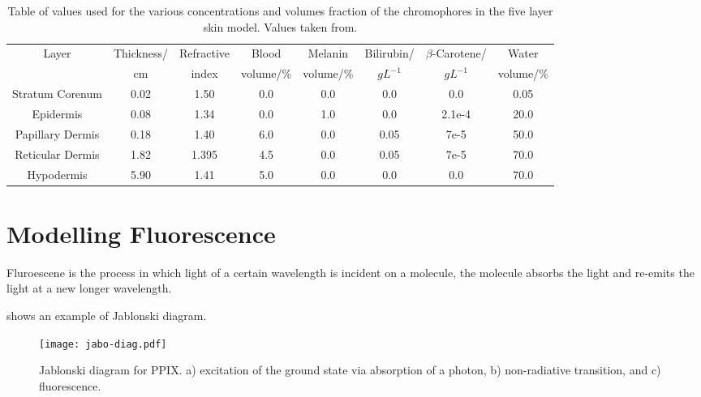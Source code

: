 \begin{table}[tb] 
    \begin{adjustwidth}{-.5in}{-.5in}  

  \begin{center}
  \begin{tabular}{|c|c|c|c|c|c|c|c|}
  \hline
  Layer & Thickness/ & Refractive & Blood & Melanin & Bilirubin/ & $\beta$-Carotene/ & Water\\
    &cm & index & volume/\% & volume/\% & $gL^{-1}$ & $gL^{-1}$ & volume/\%\\
  \hline
  Stratum Corenum  & 0.02 & 1.50  & 0.0 & 0.0 & 0.0  & 0.0 & 0.05\\
  Epidermis        & 0.08 & 1.34  & 0.0 & 1.0 & 0.0  & 2.1e-4 & 20.0\\
  Papillary Dermis & 0.18 & 1.40  & 6.0 & 0.0 & 0.05 & 7e-5 & 50.0\\
  Reticular Dermis & 1.82 & 1.395 & 4.5 & 0.0 & 0.05 & 7e-5 & 70.0\\
  Hypodermis       & 5.90 & 1.41  & 5.0 & 0.0 & 0.0  & 0.0 & 70.0\\

  \hline
  \end{tabular}
    \caption{Table of values used for the various concentrations and volumes fraction of the chromophores in the five layer skin model. Values taken from\cite{krishnaswamy2004biophysically,meglinski2002quantitative,campbell20153d,iglesias2015biophysically}.}
  \label{tab:optpropsvals}
  \end{center}
      \end{adjustwidth}

\end{table}


\FloatBarrier

\section{Modelling Fluorescence}

Fluroescene is the process in which light of a certain wavelength is incident on a molecule, the molecule absorbs the light and re-emits the light at a new longer wavelength.

 shows an example of Jablonski diagram.

\begin{figure}[!htpb]
	\centering
	\texttt{[image: jabo-diag.pdf]}
	\caption{Jablonski diagram for PPIX. a) excitation of the ground state via absorption of a photon, b) non-radiative transition, and c) fluorescence.}
	\label{fig:Jabo}
\end{figure}

